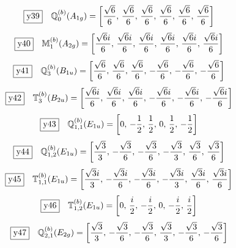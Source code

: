 \documentclass[fleqn,10pt,landscape]{jsarticle}
\begin{document}
\begin{dmath*}
\fbox{y39}\quad \mathbb{Q}_{0}^{(b)}(A_{1g})=\left[ \frac{\sqrt{6}}{6},\, \frac{\sqrt{6}}{6},\, \frac{\sqrt{6}}{6},\, \frac{\sqrt{6}}{6},\, \frac{\sqrt{6}}{6},\, \frac{\sqrt{6}}{6} \right]
\end{dmath*}
\begin{dmath*}
\fbox{y40}\quad \mathbb{M}_{1}^{(b)}(A_{2g})=\left[ \frac{\sqrt{6} i}{6},\, \frac{\sqrt{6} i}{6},\, \frac{\sqrt{6} i}{6},\, \frac{\sqrt{6} i}{6},\, \frac{\sqrt{6} i}{6},\, \frac{\sqrt{6} i}{6} \right]
\end{dmath*}
\begin{dmath*}
\fbox{y41}\quad \mathbb{Q}_{3}^{(b)}(B_{1u})=\left[ \frac{\sqrt{6}}{6},\, \frac{\sqrt{6}}{6},\, \frac{\sqrt{6}}{6},\, - \frac{\sqrt{6}}{6},\, - \frac{\sqrt{6}}{6},\, - \frac{\sqrt{6}}{6} \right]
\end{dmath*}
\begin{dmath*}
\fbox{y42}\quad \mathbb{T}_{3}^{(b)}(B_{2u})=\left[ \frac{\sqrt{6} i}{6},\, \frac{\sqrt{6} i}{6},\, \frac{\sqrt{6} i}{6},\, - \frac{\sqrt{6} i}{6},\, - \frac{\sqrt{6} i}{6},\, - \frac{\sqrt{6} i}{6} \right]
\end{dmath*}
\begin{dmath*}
\fbox{y43}\quad \mathbb{Q}_{1,1}^{(b)}(E_{1u})=\left[ 0,\, - \frac{1}{2},\, \frac{1}{2},\, 0,\, \frac{1}{2},\, - \frac{1}{2} \right]
\end{dmath*}
\begin{dmath*}
\fbox{y44}\quad \mathbb{Q}_{1,2}^{(b)}(E_{1u})=\left[ \frac{\sqrt{3}}{3},\, - \frac{\sqrt{3}}{6},\, - \frac{\sqrt{3}}{6},\, - \frac{\sqrt{3}}{3},\, \frac{\sqrt{3}}{6},\, \frac{\sqrt{3}}{6} \right]
\end{dmath*}
\begin{dmath*}
\fbox{y45}\quad \mathbb{T}_{1,1}^{(b)}(E_{1u})=\left[ \frac{\sqrt{3} i}{3},\, - \frac{\sqrt{3} i}{6},\, - \frac{\sqrt{3} i}{6},\, - \frac{\sqrt{3} i}{3},\, \frac{\sqrt{3} i}{6},\, \frac{\sqrt{3} i}{6} \right]
\end{dmath*}
\begin{dmath*}
\fbox{y46}\quad \mathbb{T}_{1,2}^{(b)}(E_{1u})=\left[ 0,\, \frac{i}{2},\, - \frac{i}{2},\, 0,\, - \frac{i}{2},\, \frac{i}{2} \right]
\end{dmath*}
\begin{dmath*}
\fbox{y47}\quad \mathbb{Q}_{2,1}^{(b)}(E_{2g})=\left[ \frac{\sqrt{3}}{3},\, - \frac{\sqrt{3}}{6},\, - \frac{\sqrt{3}}{6},\, \frac{\sqrt{3}}{3},\, - \frac{\sqrt{3}}{6},\, - \frac{\sqrt{3}}{6} \right]
\end{dmath*}
\end{document}
